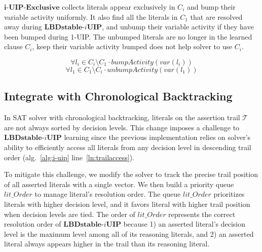 \documentclass[runningheads]{llncs}
\newcommand{\oneUIPClause}{\ensuremath{C_{1}}}
\newcommand{\iUIPClause}{\ensuremath{C_{i}}}
\newcommand{\assertionTrail}{\trail}
\newcommand{\IUIP}{\textbf{LBDstable-$i$UIP}}
\newcommand{\IUIPDist}{\textbf{i-UIP-Exclusive}}
\newcommand{\trail}{\ensuremath{\mathcal{T}}}
\begin{document}
$\IUIPDist$ collects literals appear exclusively in $\iUIPClause$ and
bump their variable activity uniformly. It also find all the literals
in $\oneUIPClause$ that are resolved away during $\IUIP$, and unbump
their variable activity if they have been bumped during 1-UIP. The
unbumped literals are no longer in the learned clause $\iUIPClause$,
keep their variable activity bumped does not help solver to use
$\iUIPClause$.

\[ \forall l_{i} \in  \iUIPClause \setminus \oneUIPClause \cdot bumpActivity(var(l_{i})) 
\]
\[ \forall l_{1} \in  \oneUIPClause \setminus \iUIPClause \cdot unbumpActivity(var(l_{1})) 
\]


\subsection{Integrate with Chronological Backtracking}
In SAT solver with chronological backtracking, literals on the
assertion trail $\assertionTrail$ are not always sorted by decision
levels. This change imposes a challenge to $\IUIP$ learning since the
previous implementation relies on solver's ability to efficiently
access all literals from any decision level in descending trail order
(alg.~\ref{alg:i-uip} line~\ref{ln:trailaccess}).

To mitigate this challenge, we modify the solver to track the precise
trail position of all asserted literals with a single vector. We then
build a priority queue $lit\_Order$ to manage literal's resolution
order. The queue $lit\_Order$ prioritizes literals with higher
decision level, and it favors literal with higher trail position when
decision levels are tied. The order of $lit\_Order$ represents the
correct resolution order of $\IUIP$ because 1) an asserted literal's
decision level is the maximum level among all of its reasoning
literals, and 2) an asserted literal always appears higher in the
trail than its reasoning literal.
\end{document}
